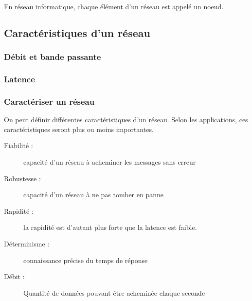 En réseau informatique, chaque élément d'un réseau est appelé un  \hyperlink{DefNoeud}{noeud}.



\subsection{Caractéristiques d'un réseau}

\subsubsection{Débit et bande passante}

\subsubsection{Latence}

\subsubsection{Caractériser un réseau}
On peut définir différentes caractéristiques d'un réseau. Selon les applications, ces caractéristiques seront plus ou moins importantes.
\begin{description}
  \item [Fiabilité : ] capacité d'un réseau à acheminer les messages sans erreur
  \item [Robustesse : ] capacité d'un réseau à ne pas tomber en panne
  \item [Rapidité : ] la rapidité est d'autant plus forte que la latence est faible.
  \item [Déterminisme : ] connaissance précise du temps de réponse
  \item [Débit : ] Quantité de données pouvant être acheminée chaque seconde
\end{description}
